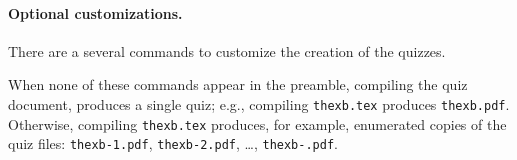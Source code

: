 \documentclass{article}
\begin{document}
\paragraph*{Optional customizations.}\label{para:OCs} There are a several commands to customize the creation of
the quizzes.
\bVerb\small{}%
\begin{dCmd}[fontsize=\small,commandchars=!()]{\bxSize}
\useNameToCustomize
{}
\end{dCmd}
\eVerb When none of these commands appear in the preamble, compiling the quiz
document, produces a single quiz; e.g., compiling \texttt{thexb.tex} produces
\texttt{thexb.pdf}. Otherwise, compiling \texttt{thexb.tex} produces, for
example, enumerated copies of the quiz files:
\texttt{thexb-1.pdf}, \texttt{thexb-2.pdf}, \dots,
\texttt{thexb-.pdf}.
\end{document}
